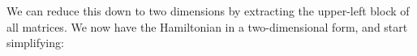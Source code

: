 
We can reduce this down to two dimensions by extracting the upper-left block of all matrices. We now have the Hamiltonian in a two-dimensional form, and start simplifying:

